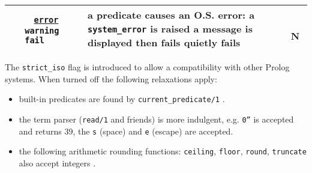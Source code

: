 \begin{tabular}{|L{4.5cm}|C{2.8cm}|L{6.2cm}|C{0,6cm}|}
\hline

~
\linebreak
{} &
  ~
\linebreak
  \texttt{\underline{error}}
\linebreak
  \texttt{warning}
\linebreak
  \texttt{fail} &
    a predicate causes an O.S. error:
\linebreak
    a \texttt{system\_error} is raised
\linebreak
    a message is displayed then fails
\linebreak
    quietly fails &
      ~
\linebreak
      N \\

\hline
\end{tabular}

The \texttt{strict\_iso} flag is introduced to allow a compatibility with
other Prolog systems. When turned off the following relaxations apply:

\begin{itemize}

\item built-in predicates are found by \texttt{current\_predicate/1}
.

\item the term parser (\texttt{read/1} and friends) is more indulgent, e.g. \texttt{0''} is
  accepted and returns 39, the  \texttt{{\bs}s} (space) and
  \texttt{{\bs}e} (escape) are accepted.

\item the following arithmetic rounding functions: \texttt{ceiling}, \texttt{floor}, \texttt{round}, \texttt{truncate} also accept integers .

\end{itemize}

\begin{PlErrors}







\end{PlErrors}

